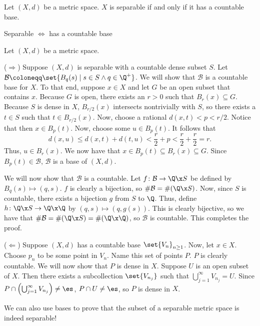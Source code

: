 \documentclass[class=article, crop=false]{standalone}
\begin{document}
\begin{thm}{\label{thm:sepiffcountbase}}
    Let $(X,d)$ be a metric space. $X$ is separable if and only if it has a countable base.
\end{thm}
\begin{slogan}
    Separable $\iff$ has a countable base
\end{slogan}
\begin{pf}
    Let $(X,d)$ be a metric space.

    ($\Rightarrow$) Suppose $(X,d)$ is separable with a countable dense subset $S$. Let $\mathcal B \coloneqq \set{B_q(s) \mid s \in S \land q \in \Q^+}$. We will show that $\mathcal B$ is a countable base for $X$. To that end, suppose $x \in X$ and let $G$ be an open subset that contains $x$. Because $G$ is open, there exists an $r > 0$ such that $B_r(x) \subseteq G$. Because $S$ is dense in $X$,
    $B_{r/2}(x)$ intersects nontrivially with $S$, so there exists a $t \in S$ such that $t \in B_{r/2}(x)$. Now, choose a rational $d(x,t) < p < r/2$. Notice that then $x \in B_p(t)$. Now, choose some $u \in B_{p}(t)$. It follows that
        \[
            d(x,u) \leq d(x,t) + d(t,u) < \frac{r}{2} + p < \frac{r}{2} + \frac{r}{2} = r.
        \]
    Thus, $u \in B_r(x)$. We now have that $x \in B_{p}(t) \subseteq B_r(x) \subseteq G$. Since $B_p(t) \in \mathcal B$, $\mathcal B$ is a base of $(X,d)$.

    We will now show that $\mathcal B$ is a countable. Let $f \colon \mathcal B \to \Q \x S$ be defined by $B_q(s) \mapsto (q,s)$. $f$ is clearly a bijection, so $\# \mathcal B = \# (\Q \x S)$. Now, since $S$ is countable, there exists a bijection $g$ from $S$ to $\Q$.
    Thus, define $h \colon \Q \x S \to \Q \x \Q$ by $(q,s) \mapsto (q, g(s))$. This is clearly bijective, so we have that $\# \mathcal B = \# (\Q \x S) = \# (\Q \x \Q)$, so $\mathcal B$ is countable. This completes the proof.

    ($\Leftarrow$) Suppose $(X,d)$ has a countable base $\set{V_n}_{n \geq 1}$. Now, let $x \in X$. Choose $p_n$ to be some point in $V_n$. Name this set of points $P$. $P$ is clearly countable. We will now show that $P$ is dense in $X$. Suppose $U$ is an open subset of $X$. Then there exists a subcollection $\set{V_{n_j}}$ such that $ \bigcup_{j=1}^{\infty} V_{n_j} = U$. Since $P \cap  \left( \bigcup_{j=1}^{\infty} V_{n_j} \right) \neq \es$,
    $P \cap U \neq \es$, so $P$ is dense in $X$.
\end{pf}

We can also use bases to prove that the subset of a separable metric space is indeed separable!
\end{document}
